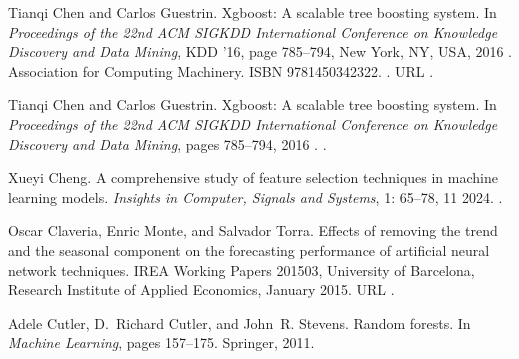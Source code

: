 \documentclass[letterpaper,12pt, twoside]{report}
\providecommand{\DIFdeltex}[1]{{\protect\color{red} \scriptsize #1}} %
\providecommand{\DIFdel}[1]{\texorpdfstring{\DIFdeltex{#1}}{}} %
\begin{document}
\DIFdel{Tianqi Chen and Carlos Guestrin.
}%
\DIFdel{Xgboost: A scalable tree boosting system.
}%
\DIFdel{In \emph{Proceedings of the 22nd ACM SIGKDD International Conference
  on Knowledge Discovery and Data Mining}, KDD '16, page 785–794, New York,
  NY, USA, 2016}%
\DIFdel{. Association for Computing Machinery.
}%
\DIFdel{ISBN 9781450342322.
}%
\DIFdel{.
}%
\DIFdel{URL }%
\DIFdel{.
}%

\DIFdel{Tianqi Chen and Carlos Guestrin.
}%
\DIFdel{Xgboost: A scalable tree boosting system.
}%
\DIFdel{In \emph{Proceedings of the 22nd ACM SIGKDD International Conference
  on Knowledge Discovery and Data Mining}, pages 785--794, 2016}%
\DIFdel{.
}%
\DIFdel{.
}%

\DIFdel{Xueyi Cheng.
}%
\DIFdel{A comprehensive study of feature selection techniques in machine
  learning models.
}%
\DIFdel{\emph{Insights in Computer, Signals and Systems}, 1:}%
\DIFdel{65--78,
  11 2024.
}%
\DIFdel{.
}%

\DIFdel{Oscar Claveria, Enric Monte, and Salvador Torra.
}%
\DIFdel{Effects of removing the trend and the seasonal component on the
  forecasting performance of artificial neural network techniques.
}%
\DIFdel{IREA Working Papers 201503, University of Barcelona, Research
  Institute of Applied Economics, January 2015.
}%
\DIFdel{URL }%
\DIFdel{.
}%

\DIFdel{Adele Cutler, D.~Richard Cutler, and John~R. Stevens.
}%
\DIFdel{Random forests.
}%
\DIFdel{In \emph{Machine Learning}, pages 157--175. Springer, 2011.
}%
\end{document}
